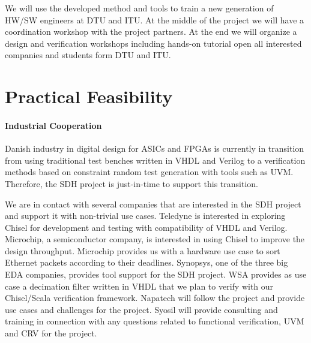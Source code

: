 \documentclass[fleqn,12pt]{article}
\newcommand{\todo}[1]{{\it TODO: #1}}
\begin{document}
We will use the developed method and tools to train a new generation of HW/SW engineers
at DTU and ITU.
At the middle of the project we will have a coordination workshop with the project partners.
At the end we will organize a design and verification workshops including hands-on tutorial
open all interested companies and students form DTU and ITU.

\section{Practical Feasibility}


%



\paragraph*{Industrial Cooperation}

Danish industry in digital design for ASICs and FPGAs is currently in transition from using traditional
test benches written in VHDL and Verilog to a verification methods based on constraint random
test generation with tools such as UVM. Therefore, the SDH project is just-in-time to support this
transition.

We are in contact with several companies that are interested in the SDH project and support it
with non-trivial use cases.
Teledyne is interested in exploring Chisel for development and testing with compatibility of VHDL and Verilog.
Microchip, a semiconductor company, is interested in using Chisel to improve the design throughput.
Microchip provides us with a hardware use case to sort Ethernet packets according to their deadlines.
Synopsys, one of the three big EDA  companies, provides tool support for the SDH project.
WSA provides as use case a decimation filter written in VHDL that we plan to verify with our
Chisel/Scala  verification framework.
Napatech will follow the project and provide use cases and challenges for the project.
Syosil will provide consulting and training in connection with any questions related to functional verification,
UVM and CRV for the project.
\end{document}
